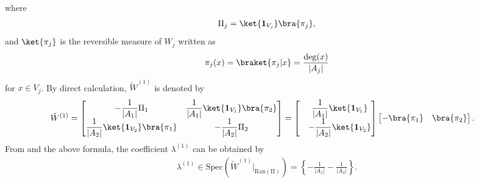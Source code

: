 \documentclass[12pt]{article}
\numberwithin{lemma}{section}
\numberwithin{proposition}{section}
\numberwithin{remark}{section}
\numberwithin{definition}{section}
\begin{document}
where
\begin{align*}
    \Pi_j=\ket{\boldsymbol{1}_{V_j}}\bra{\pi_j},
\end{align*}
and $\ket{\pi_j}$ is the reversible measure of $W_{j}$ written as
\begin{align*}
    \pi_{j}(x)=\braket{\pi_j|x}=\frac{\deg(x)}{|A_j|}
\end{align*}
for $x \in V_j$.
By direct calculation, $\tilde{W}^{(1)}$ is denoted by
\begin{align*}
    \tilde{W}^{(1)}&=
    \begin{bmatrix}
        -\displaystyle \frac{1}{|A_1|}\Pi_1 & \displaystyle\frac{1}{|A_1|}\ket{\boldsymbol{1}_{V_1}}\bra{\pi_2} \\
        \displaystyle\frac{1}{|A_2|}\ket{\boldsymbol{1}_{V_2}}\bra{\pi_1} & -\displaystyle\frac{1}{|A_2|}\Pi_2
    \end{bmatrix} 
    =
    \begin{bmatrix}
        &\displaystyle\frac{1}{|A_1|}\ket{\boldsymbol{1}_{V_1}} \\
        &-\displaystyle\frac{1}{|A_2|}\ket{\boldsymbol{1}_{V_2}}
    \end{bmatrix}
    \begin{bmatrix}
        -\bra{\pi_1} & \bra{\pi_2}
    \end{bmatrix}.
\end{align*}
From \cite{Kato} and the above formula, the coefficient $\lambda^{(1)}$ can be obtained by
\begin{align*}
    \lambda^{(1)} \in \mathrm{Spec}\left(\tilde{W}^{(1)}|_{\mathrm{Ran(\Pi)}}\right)=\left\{-\frac{1}{|A_1|}-\frac{1}{|A_2|}\right\}.
\end{align*}
\end{document}
